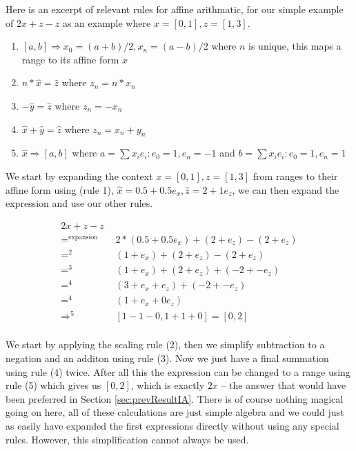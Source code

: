 Here is an excerpt of relevant rules for affine arithmatic, for our simple example of $2x + z - z$ as an example where $x = [0, 1], z = [1, 3]$.
\begin{enumerate}
  \item $[a, b] \Rightarrow x_0 = (a + b) / 2, x_n = (a - b) / 2$ where $n$ is unique, this maps a range to its affine form $\hat{x}$
  \item $n * \hat{x} = \hat{z}$ where $z_n = n * x_n$
  \item $-\hat{y} = \hat{z}$ where $z_n = -x_n$
  \item $\hat{x} + \hat{y} = \hat{z}$ where $z_n = x_n + y_n$
  \item $\hat{x} \Rightarrow [a, b]$ where $a = \sum{x_ie_i}: e_0 = 1, e_n = -1$ and $b = \sum{x_ie_i}: e_0 = 1, e_n = 1$
\end{enumerate}

We start by expanding the context $x = [0, 1], z = [1, 3]$ from ranges to their affine form using (rule 1), $\hat{x} = 0.5 + 0.5e_x, \hat{z} = 2 + 1e_z$, we can then expand the expression and use our other rules.

\begin{align*}
    2x + z - z \\
    =^{\text{expansion}} \quad & 2 * (0.5 + 0.5e_x) + (2 + e_z) - (2 + e_z) \\
    =^{2} \quad & (1 + e_x) + (2 + e_z) - (2 + e_z) \\
    =^{3} \quad & (1 + e_x) + (2 + e_z) + (-2 + -e_z) \\
    =^{4} \quad & (3 + e_x + e_z) + (-2 + -e_z) \\
    =^{4} \quad & (1 + e_x + 0e_z) \\
    \Rightarrow^{5} \quad & [1 - 1 - 0, 1 + 1 + 0] = [0, 2]\\
\end{align*}

We start by applying the scaling rule (2), then we simplify subtraction to a negation and an additon using rule (3). Now we just have a final summation using rule (4) twice. After all this the expression can be changed to a range using rule (5) which gives us $[0, 2]$, which is exactly $2x$ -- the answer that would have been preferred in Section \ref{sec:prevResultIA}. There is of course nothing magical going on here, all of these calculations are just simple algebra and we could just as easily have expanded the first expressions directly without using any special rules. However, this simplification cannot always be used. 


